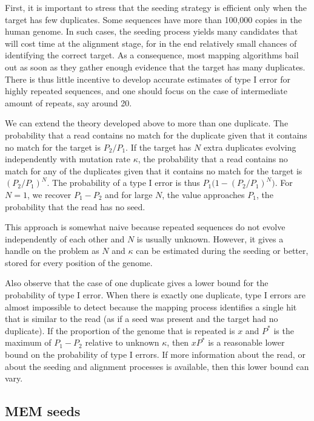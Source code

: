 \documentclass{article}
\begin{document}
First, it is important to stress that the seeding strategy is efficient
only when the target has few duplicates. Some sequences have more than
100,000 copies in the human genome. In such cases, the seeding process
yields many candidates that will cost time at the alignment stage, for in
the end relatively small chances of identifying the correct target. As a
consequence, most mapping algorithms bail out as soon as they gather
enough evidence that the target has many duplicates. There is thus little
incentive to develop accurate estimates of type I error for highly
repeated sequences, and one should focus on the case of intermediate
amount of repeats, say around 20.

We can extend the theory developed above to more than one duplicate. The
probability that a read contains no match for the duplicate given that it
contains no match for the target is $P_2 / P_1$. If the target has $N$
extra duplicates evolving independently with mutation rate $\kappa$, the
probability that a read contains no match for any of the duplicates given
that it contains no match for the target is $(P_2 / P_1)^N$. The
probability of a type I error is thus $P_1\big(1-(P_2 / P_1)^N\big)$. For
$N=1$, we recover $P_1-P_2$ and for large $N$, the value approaches $P_1$,
the probability that the read has no seed.

This approach is somewhat naive because repeated sequences do not evolve
independently of each other and $N$ is usually unknown. However, it gives
a handle on the problem as $N$ and $\kappa$ can be estimated during the
seeding or better, stored for every position of the genome.

Also observe that the case of one duplicate gives a lower bound for the
probability of type I error. When there is exactly one duplicate, type I
errors are almost impossible to detect because the mapping process
identifies a single hit that is similar to the read (as if a seed was
present and the target had no duplicate). If the proportion of the genome
that is repeated is $x$ and $P^*$ is the maximum of $P_1-P_2$ relative to
unknown $\kappa$, then $xP^*$ is a reasonable lower bound on the
probability of type I errors. If more information about the read, or about
the seeding and alignment processes is available, then this lower bound
can vary.





\subsection{MEM seeds}
\end{document}
